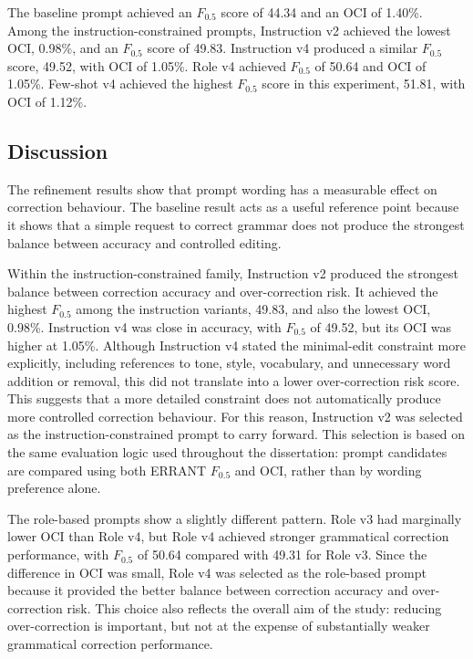The baseline prompt achieved an $F_{0.5}$ score of 44.34 and an OCI of 1.40\%. Among the instruction-constrained prompts, Instruction v2 achieved the lowest OCI, 0.98\%, and an $F_{0.5}$ score of 49.83. Instruction v4 produced a similar $F_{0.5}$ score, 49.52, with OCI of 1.05\%. Role v4 achieved $F_{0.5}$ of 50.64 and OCI of 1.05\%. Few-shot v4 achieved the highest $F_{0.5}$ score in this experiment, 51.81, with OCI of 1.12\%.

\subsection{Discussion}

The refinement results show that prompt wording has a measurable effect on correction behaviour. The baseline result acts as a useful reference point because it shows that a simple request to correct grammar does not produce the strongest balance between accuracy and controlled editing.

Within the instruction-constrained family, Instruction v2 produced the strongest balance between correction accuracy and over-correction risk. It achieved the highest $F_{0.5}$ among the instruction variants, 49.83, and also the lowest OCI, 0.98\%. Instruction v4 was close in accuracy, with $F_{0.5}$ of 49.52, but its OCI was higher at 1.05\%. Although Instruction v4 stated the minimal-edit constraint more explicitly, including references to tone, style, vocabulary, and unnecessary word addition or removal, this did not translate into a lower over-correction risk score. This suggests that a more detailed constraint does not automatically produce more controlled correction behaviour. For this reason, Instruction v2 was selected as the instruction-constrained prompt to carry forward. This selection is based on the same evaluation logic used throughout the dissertation: prompt candidates are compared using both ERRANT $F_{0.5}$ and OCI, rather than by wording preference alone.

The role-based prompts show a slightly different pattern. Role v3 had marginally lower OCI than Role v4, but Role v4 achieved stronger grammatical correction performance, with $F_{0.5}$ of 50.64 compared with 49.31 for Role v3. Since the difference in OCI was small, Role v4 was selected as the role-based prompt because it provided the better balance between correction accuracy and over-correction risk. This choice also reflects the overall aim of the study: reducing over-correction is important, but not at the expense of substantially weaker grammatical correction performance.

